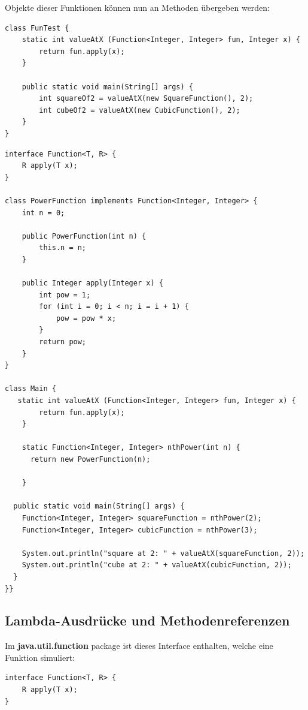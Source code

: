 \documentclass[12pt]{article}
\begin{document}
    Objekte dieser Funktionen können nun an Methoden übergeben werden:

    \begin{lstlisting}
class FunTest {
    static int valueAtX (Function<Integer, Integer> fun, Integer x) {
        return fun.apply(x);
    }

    public static void main(String[] args) {
        int squareOf2 = valueAtX(new SquareFunction(), 2);
        int cubeOf2 = valueAtX(new CubicFunction(), 2);
    }
}
    \end{lstlisting}

    \begin{lstlisting}[caption=square und cube als funktion]
    interface Function<T, R> {
    R apply(T x);
}

class PowerFunction implements Function<Integer, Integer> {
    int n = 0;

    public PowerFunction(int n) {
        this.n = n;
    }

    public Integer apply(Integer x) {
        int pow = 1;
        for (int i = 0; i < n; i = i + 1) {
            pow = pow * x;
        }
        return pow;
    }
}

class Main {
   static int valueAtX (Function<Integer, Integer> fun, Integer x) {
        return fun.apply(x);
    }
    
    static Function<Integer, Integer> nthPower(int n) { 
      return new PowerFunction(n);
      
    }
  
  public static void main(String[] args) {
    Function<Integer, Integer> squareFunction = nthPower(2); 
    Function<Integer, Integer> cubicFunction = nthPower(3);
    
    System.out.println("square at 2: " + valueAtX(squareFunction, 2));
    System.out.println("cube at 2: " + valueAtX(cubicFunction, 2));
  }
}}
    \end{lstlisting}

    \subsection*{Lambda-Ausdrücke und Methodenreferenzen}

    Im \textbf{java.util.function} package ist dieses Interface enthalten, welche eine Funktion simuliert:

    \begin{lstlisting}
interface Function<T, R> {
    R apply(T x);
}
    \end{lstlisting}
\end{document}
